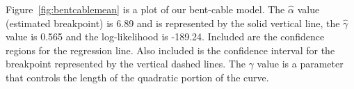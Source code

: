 Figure~\ref{fig:bentcablemean} is a plot of our bent-cable model. The $\hat\alpha$ value (estimated breakpoint) is 6.89 and is represented by the solid vertical line, the $\hat\gamma$ value is 0.565 and the log-likelihood is -189.24. Included are the confidence regions for the regression line. Also included is the confidence interval for the breakpoint represented by the vertical dashed lines. The $\gamma$ value is a parameter that controls the length of the quadratic portion of the curve.